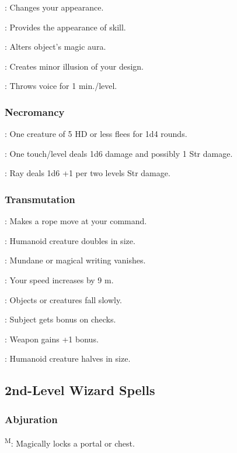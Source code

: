 	: Changes your appearance.

	: Provides the appearance of skill.

	: Alters object's magic aura.

	: Creates minor illusion of your design.

	: Throws voice for 1 min./level.

\subsubsection{Necromancy}
	: One creature of 5 HD or less flees for 1d4 rounds.

	: One touch/level deals 1d6 damage and possibly 1 Str damage.

	: Ray deals 1d6 +1 per two levels Str damage.

\subsubsection{Transmutation}
	: Makes a rope move at your command.

	: Humanoid creature doubles in size.

	: Mundane or magical writing vanishes.

	: Your speed increases by 9 m.

	: Objects or creatures fall slowly.

	: Subject gets bonus on  checks.

	: Weapon gains +1 bonus.

	: Humanoid creature halves in size.



\subsection{2nd-Level Wizard Spells}

\subsubsection{Abjuration}
	\textsuperscript{M}: Magically locks a portal or chest.

